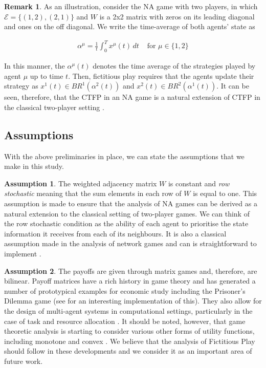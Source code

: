 \documentclass{article}
\theoremstyle{definition}
\newtheorem{assumption}{Assumption}
\newtheorem*{remark}{Remark}
\newcommand{\edgeset}{\mathcal{E}}
\newcommand{\weightset}{W}
\newcommand{\xmu}{x^{\mu}}
\begin{document}
	\begin{remark}
		As an illustration, consider the NA game with two players, in which $\edgeset = \{(1, 2),
		(2, 1)\}$ and $\weightset$ is a 2x2 matrix with zeros on its leading diagonal and ones on
		the off diagonal. We write the time-average of both agents' state as
	
		\begin{align}
			\alpha^\mu = \frac{1}{t} \int_0^T \xmu(t) \, dt & \text{ for $\mu \in \{1, 2\}$}
		\end{align}

		In this manner, the $\alpha^\mu(t)$ denotes the time average of the strategies played by
		agent $\mu$ up to time $t$. Then, fictitious play requires that the agents update their
		strategy as $x^1(t) \in BR^1(\alpha^2(t))$ and $x^2(t) \in BR^2(\alpha^1(t))$. It can be
		seen, therefore, that the CTFP in an NA game is a natural extension of CTFP in the classical
		two-player setting \cite{}.
	\end{remark}

	\subsection{Assumptions}

	With the above preliminaries in place, we can state the assumptions that we make in this study.

	\begin{assumption}
		The weighted adjacency matrix $\weightset$ is constant and \emph{row stochastic} meaning
		that the sum elements in each row of $\weightset$ is equal to one. This assumption is
		made to ensure that the analysis of NA games can be derived as a natural extension to the
		classical setting of two-player games. We can think of the row stochastic condition as the
		ability of each agent to prioritise the state information it receives from each of its
		neighbours. It is also a classical assumption made in the analysis of network games
		\cite{one of the network game papers} and can is straightforward to implement \cite{Eyad}.
	\end{assumption}

	\begin{assumption}
		The payoffs are given through matrix games and, therefore, are bilinear. Payoff matrices
		have a rich history in game theory and has generated a number of prototypical examples for
		economic study including the Prisoner's Dilemma game (see \cite{Axelrod} for an interesting
		implementation of this). They also allow for the design of multi-agent systems in
		computational settings, particularly in the case of task and resource allocation \cite{AGT
		and some of the Applied Game Theory Papers}. It should be noted, however, that game
		theoretic analysis is starting to consider various other forms of utility functions,
		including monotone \cite{Maryam} and convex \cite{Parise}. We believe that the analysis of
		Fictitious Play should follow in these developments and we consider it as an important area
		of future work.
	\end{assumption}
\end{document}
